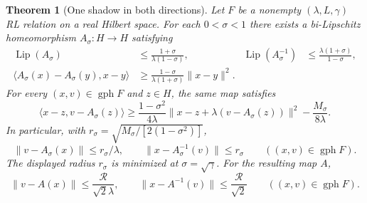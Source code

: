 \documentclass[11pt]{article}
\numberwithin{equation}{section}
\newtheorem{theorem}{Theorem}[section]
\theoremstyle{definition}
\theoremstyle{remark}
\newcommand{\gph}{\operatorname{gph}}
\newcommand{\Lip}{\operatorname{Lip}}
\newcommand{\rad}{\mathcal R}
\newcommand{\ip}[2]{\langle #1,#2\rangle}
\newcommand{\norm}[1]{\lVert #1\rVert}
\begin{document}
\begin{theorem}[One shadow in both directions]\label{thm:shadow}
Let $F$ be a nonempty $(\lambda,L,\gamma)$ RL relation on a real Hilbert
space. For each $0<\sigma<1$ there exists a bi-Lipschitz homeomorphism
$A_\sigma:H\to H$ satisfying
\begin{align}
 \Lip(A_\sigma)&\le\frac{1+\sigma}{\lambda(1-\sigma)},
 &\Lip(A_\sigma^{-1})&\le\frac{\lambda(1+\sigma)}{1-\sigma},
 \label{eq:conditioning}\\
 \ip{A_\sigma(x)-A_\sigma(y)}{x-y}
 &\ge\frac{1-\sigma}{\lambda(1+\sigma)}\norm{x-y}^2.
 \label{eq:strongmono}
\end{align}
For every $(x,v)\in\gph F$ and $z\in H$, the same map satisfies
\begin{equation}\label{eq:originalcross}
 \ip{x-z}{v-A_\sigma(z)}
 \ge\frac{1-\sigma^2}{4\lambda}
       \norm{x-z+\lambda(v-A_\sigma(z))}^2
       -\frac{M_\sigma}{8\lambda}.
\end{equation}
In particular, with
$r_\sigma=\sqrt{M_\sigma/[2(1-\sigma^2)]}$,
\begin{equation}\label{eq:pairedsigma}
 \norm{v-A_\sigma(x)}\le r_\sigma/\lambda,
 \qquad
 \norm{x-A_\sigma^{-1}(v)}\le r_\sigma
 \qquad((x,v)\in\gph F).
\end{equation}
The displayed radius $r_\sigma$ is minimized at $\sigma=\sqrt\gamma$.
For the resulting map $A$,
\begin{equation}\label{eq:pairedsharp}
 \norm{v-A(x)}\le\frac{\rad}{\sqrt2\lambda},
 \qquad
 \norm{x-A^{-1}(v)}\le\frac{\rad}{\sqrt2}
 \qquad((x,v)\in\gph F).
\end{equation}
\end{theorem}
\end{document}
